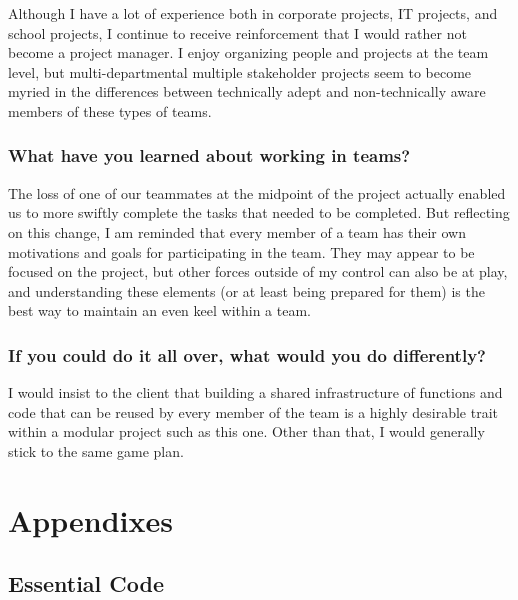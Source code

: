 \documentclass[11pt]{scrreprt}
\begin{document}
Although I have a lot of experience both in corporate projects, IT projects, and school projects, I continue to receive reinforcement that I would rather not become a project manager. I enjoy organizing people and projects at the team level, but multi-departmental multiple stakeholder projects seem to become myried in the differences between technically adept and non-technically aware members of these types of teams.

\subsection{What have you learned about working in teams?}

The loss of one of our teammates at the midpoint of the project actually enabled us to more swiftly complete the tasks that needed to be completed.
But reflecting on this change, I am reminded that every member of a team has their own motivations and goals for participating in the team.
They may appear to be focused on the project, but other forces outside of my control can also be at play, and understanding these elements (or at least being prepared for them) is the best way to maintain an even keel within a team.

\subsection{If you could do it all over, what would you do differently?}

I would insist to the client that building a shared infrastructure of functions and code that can be reused by every member of the team is a highly desirable trait within a modular project such as this one. Other than that, I would generally stick to the same game plan.

\chapter{Appendixes}

\section{Essential Code}
\end{document}
